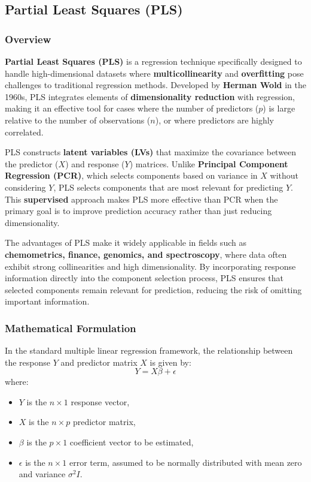 \documentclass[11pt,twoside,a4paper]{article}
\begin{document}
\subsection{Partial Least Squares (PLS)}

\subsubsection{Overview}
\textbf{Partial Least Squares (PLS)} is a regression technique specifically designed to handle high-dimensional datasets where \textbf{multicollinearity} and \textbf{overfitting} pose challenges to traditional regression methods. Developed by \textbf{Herman Wold} in the 1960s, PLS integrates elements of \textbf{dimensionality reduction} with regression, making it an effective tool for cases where the number of predictors (\( p \)) is large relative to the number of observations (\( n \)), or where predictors are highly correlated.

PLS constructs \textbf{latent variables (LVs)} that maximize the covariance between the predictor (\(X\)) and response (\(Y\)) matrices. Unlike \textbf{Principal Component Regression (PCR)}, which selects components based on variance in \( X \) without considering \( Y \), PLS selects components that are most relevant for predicting \( Y \). This \textbf{supervised} approach makes PLS more effective than PCR when the primary goal is to improve prediction accuracy rather than just reducing dimensionality.

The advantages of PLS make it widely applicable in fields such as \textbf{chemometrics, finance, genomics, and spectroscopy}, where data often exhibit strong collinearities and high dimensionality. By incorporating response information directly into the component selection process, PLS ensures that selected components remain relevant for prediction, reducing the risk of omitting important information.

\subsubsection{Mathematical Formulation}
In the standard multiple linear regression framework, the relationship between the response \( Y \) and predictor matrix \( X \) is given by:
\[
Y = X \beta + \epsilon
\]
where:
\begin{itemize}
    \item \( Y \) is the \( n \times 1 \) response vector,
    \item \( X \) is the \( n \times p \) predictor matrix,
    \item \( \beta \) is the \( p \times 1 \) coefficient vector to be estimated,
    \item \( \epsilon \) is the \( n \times 1 \) error term, assumed to be normally distributed with mean zero and variance \( \sigma^2 I \).
\end{itemize}
\end{document}
